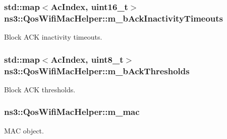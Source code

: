 \subsubsection[{\texorpdfstring{m\+\_\+b\+Ack\+Inactivity\+Timeouts}{m_bAckInactivityTimeouts}}]{\setlength{\rightskip}{0pt plus 5cm}std\+::map$<${\bf Ac\+Index}, uint16\+\_\+t$>$ ns3\+::\+Qos\+Wifi\+Mac\+Helper\+::m\+\_\+b\+Ack\+Inactivity\+Timeouts\hspace{0.3cm}{\ttfamily [private]}}\hypertarget{classns3_1_1QosWifiMacHelper_a532f48518af420308c6b2b81308e92e4}{}\label{classns3_1_1QosWifiMacHelper_a532f48518af420308c6b2b81308e92e4}


Block A\+CK inactivity timeouts. 

\subsubsection[{\texorpdfstring{m\+\_\+b\+Ack\+Thresholds}{m_bAckThresholds}}]{\setlength{\rightskip}{0pt plus 5cm}std\+::map$<${\bf Ac\+Index}, uint8\+\_\+t$>$ ns3\+::\+Qos\+Wifi\+Mac\+Helper\+::m\+\_\+b\+Ack\+Thresholds\hspace{0.3cm}{\ttfamily [private]}}\hypertarget{classns3_1_1QosWifiMacHelper_a0725f0e95f9655273bb9c4e3b862dd27}{}\label{classns3_1_1QosWifiMacHelper_a0725f0e95f9655273bb9c4e3b862dd27}


Block A\+CK thresholds. 

\subsubsection[{\texorpdfstring{m\+\_\+mac}{m_mac}}]{ ns3\+::\+Qos\+Wifi\+Mac\+Helper\+::m\+\_\+mac\hspace{0.3cm}{\ttfamily [protected]}}\hypertarget{classns3_1_1QosWifiMacHelper_ac45022993a588895c5b7cca7a521ba4e}{}\label{classns3_1_1QosWifiMacHelper_ac45022993a588895c5b7cca7a521ba4e}


M\+AC object. 

